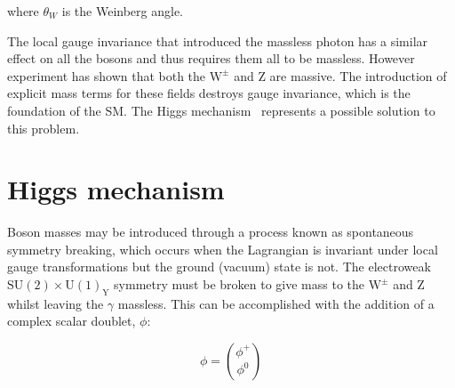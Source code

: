 
where $\theta_{W}$ is the Weinberg angle. 

The local gauge invariance that introduced the massless photon has a similar effect on all the bosons and thus requires them all to be massless. However experiment has shown that both the $\mathrm{W^{\pm}}$ and Z are massive. The introduction of explicit mass terms for these fields destroys gauge invariance, which is the foundation of the SM. The Higgs mechanism~\cite{citeulike:918519} represents a possible solution to this problem.



\section{Higgs mechanism}

Boson masses may be introduced through a process known as spontaneous symmetry breaking, which occurs when the Lagrangian is invariant under local gauge transformations but the ground (vacuum) state is not. The electroweak $\mathrm{SU(2) \times U(1)_{Y}}$ symmetry must be broken to give mass to the $\mathrm{W^{\pm}}$ and Z whilst leaving the $\gamma$ massless. This can be accomplished with the addition of a complex scalar doublet, $\phi$:

\begin{equation}
	\phi = \binom{\phi^{+}}{\phi^{0}}
\end{equation}



